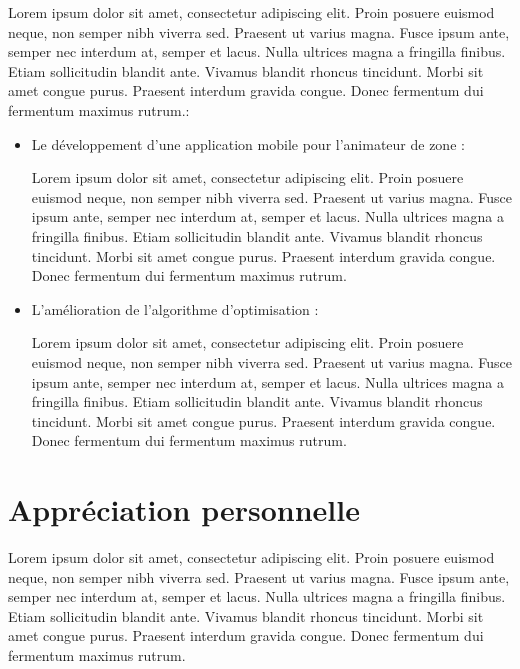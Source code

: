    Lorem ipsum dolor sit amet, consectetur adipiscing elit. Proin posuere euismod neque, non semper nibh viverra sed. Praesent ut varius magna. Fusce ipsum ante, semper nec interdum at, semper et lacus. Nulla ultrices magna a fringilla finibus. Etiam sollicitudin blandit ante. Vivamus blandit rhoncus tincidunt. Morbi sit amet congue purus. Praesent interdum gravida congue. Donec fermentum dui fermentum maximus rutrum.:
    \medskip
    
    \renewcommand{\labelitemi}{$\bullet$}
    \begin{itemize}
        \item Le développement d'une application mobile pour l'animateur de zone :
        
        Lorem ipsum dolor sit amet, consectetur adipiscing elit. Proin posuere euismod neque, non semper nibh viverra sed. Praesent ut varius magna. Fusce ipsum ante, semper nec interdum at, semper et lacus. Nulla ultrices magna a fringilla finibus. Etiam sollicitudin blandit ante. Vivamus blandit rhoncus tincidunt. Morbi sit amet congue purus. Praesent interdum gravida congue. Donec fermentum dui fermentum maximus rutrum.
        
        \medskip
        
        \item L'amélioration de l'algorithme d'optimisation : 
        
        Lorem ipsum dolor sit amet, consectetur adipiscing elit. Proin posuere euismod neque, non semper nibh viverra sed. Praesent ut varius magna. Fusce ipsum ante, semper nec interdum at, semper et lacus. Nulla ultrices magna a fringilla finibus. Etiam sollicitudin blandit ante. Vivamus blandit rhoncus tincidunt. Morbi sit amet congue purus. Praesent interdum gravida congue. Donec fermentum dui fermentum maximus rutrum.
    \end{itemize}
    
    
    
\section*{Appréciation personnelle}

    Lorem ipsum dolor sit amet, consectetur adipiscing elit. Proin posuere euismod neque, non semper nibh viverra sed. Praesent ut varius magna. Fusce ipsum ante, semper nec interdum at, semper et lacus. Nulla ultrices magna a fringilla finibus. Etiam sollicitudin blandit ante. Vivamus blandit rhoncus tincidunt. Morbi sit amet congue purus. Praesent interdum gravida congue. Donec fermentum dui fermentum maximus rutrum.





    


